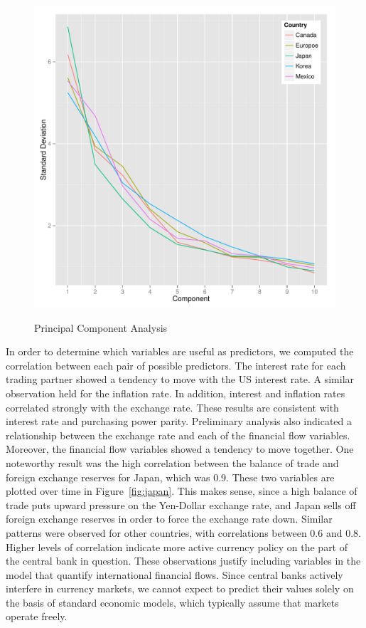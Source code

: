 \documentclass{sig-alternate-05-2015}
\begin{document}
\begin{figure}
\centering
\caption{Principal Component Analysis}
\includegraphics[scale=0.45]{prinComps.pdf}
\label{fig:pca}
\end{figure}

In order to determine which variables are useful as predictors, we computed the correlation between each pair of possible predictors. The interest rate for each trading partner showed a tendency to move with the US interest rate. A similar observation held for the inflation rate. In addition, interest and inflation rates correlated strongly with the exchange rate. These results are consistent with interest rate and purchasing power parity. Preliminary analysis also indicated a relationship between the exchange rate and each of the financial flow variables. Moreover, the financial flow variables showed a tendency to move together. One noteworthy result was the high correlation between the balance of trade and foreign exchange reserves for Japan, which was 0.9. These two variables are plotted over time in Figure~\ref{fig:japan}. This makes sense, since a high balance of trade puts upward pressure on the Yen-Dollar exchange rate, and Japan sells off foreign exchange reserves in order to force the exchange rate down. Similar patterns were observed for other countries, with correlations between 0.6 and 0.8. Higher levels of correlation indicate more active currency policy on the part of the central bank in question. These observations justify including variables in the model that quantify international financial flows. Since central banks actively interfere in currency markets, we cannot expect to predict their values solely on the basis of standard economic models, which typically assume that markets operate freely.
\end{document}
